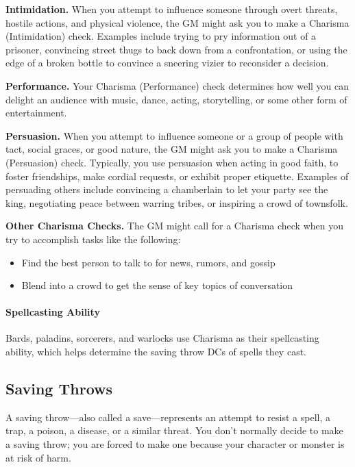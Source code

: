 \documentclass[
]{article}
\providecommand{\tightlist}{%
  \setlength{\itemsep}{0pt}\setlength{\parskip}{0pt}}
\begin{document}
\textbf{Intimidation.} When you attempt to influence someone through
overt threats, hostile actions, and physical violence, the GM might ask
you to make a Charisma (Intimidation) check. Examples include trying to
pry information out of a prisoner, convincing street thugs to back down
from a confrontation, or using the edge of a broken bottle to convince a
sneering vizier to reconsider a decision.

\textbf{Performance.} Your Charisma (Performance) check determines how
well you can delight an audience with music, dance, acting,
storytelling, or some other form of entertainment.

\textbf{Persuasion.} When you attempt to influence someone or a group of
people with tact, social graces, or good nature, the GM might ask you to
make a Charisma (Persuasion) check. Typically, you use persuasion when
acting in good faith, to foster friendships, make cordial requests, or
exhibit proper etiquette. Examples of persuading others include
convincing a chamberlain to let your party see the king, negotiating
peace between warring tribes, or inspiring a crowd of townsfolk.

\textbf{Other Charisma Checks.} The GM might call for a Charisma check
when you try to accomplish tasks like the following:

\begin{itemize}
\tightlist
\item
  Find the best person to talk to for news, rumors, and gossip
\item
  Blend into a crowd to get the sense of key topics of conversation
\end{itemize}

\hypertarget{spellcasting-ability-2}{%
\paragraph{Spellcasting Ability}\label{spellcasting-ability-2}}

Bards, paladins, sorcerers, and warlocks use Charisma as their
spellcasting ability, which helps determine the saving throw DCs of
spells they cast.

\hypertarget{saving-throws}{%
\subsection{Saving Throws}\label{saving-throws}}

A saving throw---also called a save---represents an attempt to resist a
spell, a trap, a poison, a disease, or a similar threat. You don't
normally decide to make a saving throw; you are forced to make one
because your character or monster is at risk of harm.
\end{document}
